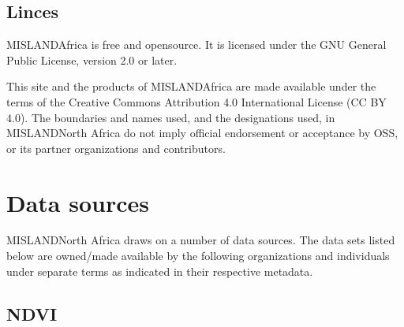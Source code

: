 \documentclass[letterpaper,10pt,english]{sphinxmanual}
\begin{document}
\section{Linces}
\label{\detokenize{Introduction/general_information:linces}}
\sphinxAtStartPar
MISLAND\sphinxhyphen{}Africa is free and open\sphinxhyphen{}source. It is licensed under the GNU General Public License, version 2.0 or later.

\sphinxAtStartPar
This site and the products of MISLAND\sphinxhyphen{}Africa are made available under the terms of the Creative Commons Attribution 4.0 International License (CC BY 4.0). The boundaries and names used, and the designations used, in MISLAND\sphinxhyphen{}North Africa do not imply official endorsement or acceptance by OSS, or its partner organizations and contributors.

\sphinxstepscope


\chapter{Data sources}
\label{\detokenize{Introduction/data:data-sources}}\label{\detokenize{Introduction/data::doc}}
\sphinxAtStartPar
MISLAND\sphinxhyphen{}North Africa draws on a number of data sources. The data sets listed below are
owned/made available by the following organizations and individuals under
separate terms as indicated in their respective metadata.


\section{NDVI}
\label{\detokenize{Introduction/data:ndvi}}
\end{document}
